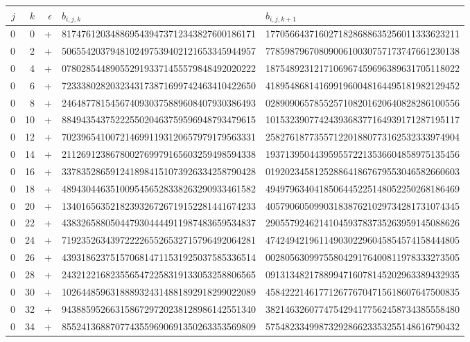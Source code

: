 \begin{longtable}{rrrll}
$j$ & $k$ & $\epsilon$ & $b_{i,j,k}$ & $b_{i,j,k+1}$ \\ \hline\endhead
0 & 0 & + & 8174761203488695439473712343827600186171 & 1770566437160271828688635256011333623211 \\
0 & 2 & + & 5065542037948102497539402121653345944957 & 7785987967080900610030757173747661230138 \\
0 & 4 & + & 0780285448905529193371455579848492020222 & 1875489231217106967459696389631705118022 \\
0 & 6 & + & 7233380282032343173871699742463410422650 & 4189548681416991960048164495181982129452 \\
0 & 8 & + & 2464877815456740930375889608407930386493 & 0289090657855257108201620640828286100556 \\
0 & 10 & + & 8849435437522255020463759596948793479615 & 1015323907742439368377164939171287195117 \\
0 & 12 & + & 7023965410072146991193120657979179563331 & 2582761877355712201880773162532333974904 \\
0 & 14 & + & 2112691238678002769979165603259498594338 & 1937139504439595572213536604858975135456 \\
0 & 16 & + & 3378352865912418984151073926334258790428 & 0192023458125288641867679553046582660603 \\
0 & 18 & + & 4894304463510095456528338263290933461582 & 4949796340418506445225148052250268186469 \\
0 & 20 & + & 1340165635218239326726719152281441674233 & 4057906050990318387621029734281731074345 \\
0 & 22 & + & 4383265880504479304444911987483659534837 & 2905579246214104593783735263959145088626 \\
0 & 24 & + & 7192352634397222265526532715796492064281 & 4742494219611490302296045854574158444805 \\
0 & 26 & + & 4393186237515706814711531925037585336514 & 0028056309975580429176400811978333273505 \\
0 & 28 & + & 2432122168235565472258319133053258806565 & 0913134821788994716078145202963389432935 \\
0 & 30 & + & 1026448596318889324314881892918299022089 & 4584222146177126776704715618607647500835 \\
0 & 32 & + & 9438859526631586729720238128986142551340 & 3821463260774754294177562458734385558480 \\
0 & 34 & + & 8552413688707743559690691350263353569809 & 5754823349987329286623353255148616790432 \\

\end{longtable}
